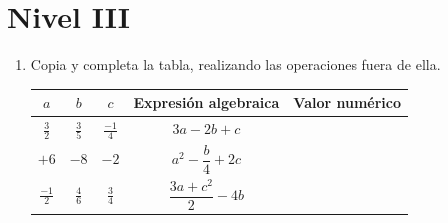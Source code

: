 \documentclass[10pt,twoside]{article}
\begin{document}
\section*{Nivel III}
\begin{enumerate}
 \item Copia y completa la tabla, realizando las operaciones fuera de ella.
 \begin{center}
\begin{tabular}{|c|c|c|c|c|}\hline
$a$ & $b$ & $c$ & Expresión algebraica & Valor numérico \\ \hline
$\frac{3}{2}$ & $\frac{3}{5}$ & $\frac{-1}{4}$ & $3a-2b+c$ & \\ \hline
$+6$ & $-8$ & $-2$ & $a^{2}-\dfrac{b}{4}+2c$ & \rule[-0.3cm]{0cm}{0.8cm} \\ \hline
$\frac{-1}{2}$ & $\frac{4}{6}$ & $\frac{3}{4}$ & $\dfrac{3a+c^{2}}{2}-4b$ & \rule[-0.3cm]{0cm}{0.8cm} \\ \hline
 \end{tabular}
 \end{center}

\end{enumerate}
\end{document}
